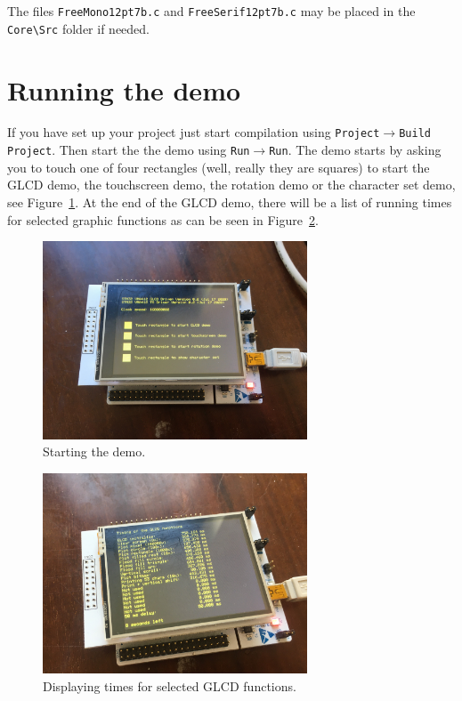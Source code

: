 \documentclass[12pt]{article}
\begin{document}
The files \lstinline|FreeMono12pt7b.c| and \lstinline|FreeSerif12pt7b.c| may be placed in the \lstinline|Core\Src| folder if needed.


\section{Running the demo}
If you have set up your project just start compilation using \texttt{Project}$\rightarrow$\texttt{Build Project}. Then start the the demo using \texttt{Run}$\rightarrow$\texttt{Run}. The demo starts by asking you to touch one of four rectangles (well, really they are squares) to start the GLCD demo, the touchscreen demo, the rotation demo or the character set demo, see Figure~\ref{fig:2}. At the end of the GLCD demo, there will be a list of running times for selected graphic functions as can be seen in Figure~\ref{fig:3}.

\begin{figure}[!ht]
\centering
\includegraphics[width=0.7\textwidth]{start_demo}
\caption{Starting the demo.}
\label{fig:2}
\end{figure}

\begin{figure}[!ht]
\centering
\includegraphics[width=0.7\textwidth]{times}
\caption{Displaying times for selected GLCD functions.}
\label{fig:3}
\end{figure}
\end{document}
